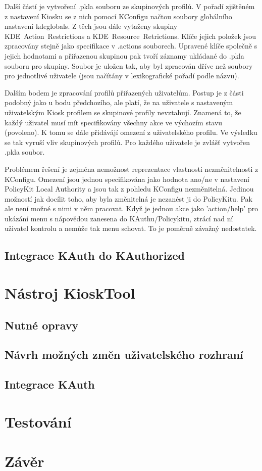 Další částí je vytvoření .pkla souboru ze skupinových profilů. V pořadí
zjištěném z nastavení Kiosku se z nich pomocí KConfigu načtou soubory globálního
nastavení kdeglobals. Z těch jsou dále vytaženy skupiny KDE~Action~Restrictions
a KDE~Resource~Retrictions. Klíče jejich položek jsou zpracovány stejně jako
specifikace v .actions souborech. Upravené klíče společně s jejich hodnotami
a přiřazenou skupinou pak tvoří záznamy ukládané do .pkla souboru pro skupiny.
Soubor je uložen tak, aby byl zpracován dříve než soubory pro jednotlivé
uživatele (jsou načítány v lexikografické pořadí podle názvu).

Dalším bodem je zpracování profilů přiřazených uživatelům. Postup je z části
podobný jako u bodu předchozího, ale platí, že na uživatele s nastaveným
uživatelským Kiosk profilem se skupinové profily nevztahují. Znamená to, že
každý uživatel musí mít specifikovány všechny akce ve výchozím stavu (povoleno).
K tomu se dále přidávájí omezení z uživatelského profilu. Ve výsledku se tak
vyruší vliv skupinových profilů. Pro každého uživatele je zvlášť vytvořen .pkla
soubor.

Problémem řešení je zejména nemožnost reprezentace vlastnosti nezměnitelnosti
z KConfigu. Omezení jsou jednou specifikována jako hodnota ano/ne v nastavení
PolicyKit Local Authority a jsou tak z pohledu KConfigu nezměnitelná. Jedinou
možností jak docílit toho, aby byla změnitelná je nezanést ji do PolicyKitu.
Pak ale není možné s nimi v něm pracovat. Když je jednou akce jako 'action/help'
pro ukázání menu s nápovědou zanesena do KAuthu/Policykitu, ztrácí nad ní
uživatel kontrolu a nemůže tak menu schovat. To je poměrně závažný nedostatek.

\section{Integrace KAuth do KAuthorized}



\chapter{Nástroj KioskTool}
\section{Nutné opravy}
\section{Návrh možných změn uživatelského rozhraní}
\section{Integrace KAuth}
\chapter{Testování}
\chapter{Závěr}
\cite{fitWeb}
